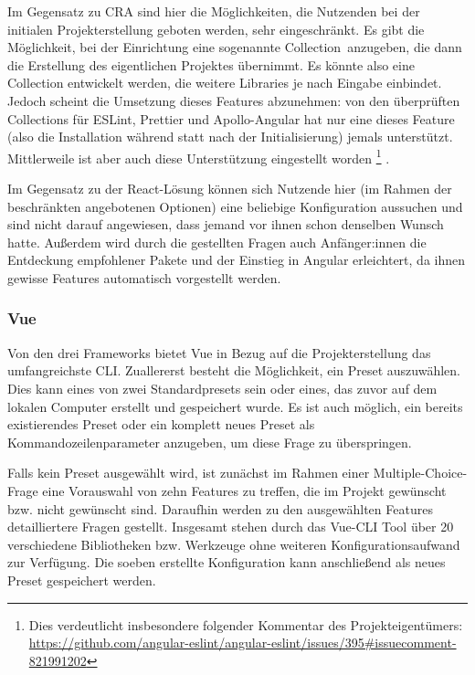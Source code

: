 Im Gegensatz zu \gls{CRA} sind hier die Möglichkeiten, die Nutzenden bei der initialen Projekterstellung geboten werden, sehr eingeschränkt. Es gibt die Möglichkeit, bei der Einrichtung eine sogenannte \glqq Collection\grqq\ anzugeben, die dann die Erstellung des eigentlichen Projektes übernimmt. Es könnte also eine Collection entwickelt werden, die weitere Libraries je nach Eingabe einbindet. Jedoch scheint die Umsetzung dieses Features abzunehmen: von den überprüften Collections für ESLint, Prettier und Apollo-Angular hat nur eine dieses Feature (also die Installation während statt nach der Initialisierung) jemals unterstützt. Mittlerweile ist aber auch diese Unterstützung eingestellt worden \cite{angular_eslint}\footnote{Dies verdeutlicht insbesondere folgender Kommentar des Projekteigentümers: \url{https://github.com/angular-eslint/angular-eslint/issues/395\#issuecomment-821991202}} \cite{prettier_angular_collection_file} \cite{apollo_angular_collection_file}.

Im Gegensatz zu der React-Lösung können sich Nutzende hier (im Rahmen der beschränkten angebotenen Optionen) eine beliebige Konfiguration aussuchen und sind nicht darauf angewiesen, dass jemand vor ihnen schon denselben Wunsch hatte. Außerdem wird durch die gestellten Fragen auch Anfänger:innen die Entdeckung empfohlener Pakete und der Einstieg in Angular erleichtert, da ihnen gewisse Features automatisch vorgestellt werden.


\subsubsection{Vue}
Von den drei Frameworks bietet Vue in Bezug auf die Projekterstellung das umfangreichste \gls{CLI}. Zuallererst besteht die Möglichkeit, ein Preset auszuwählen. Dies kann eines von zwei Standardpresets sein oder eines, das zuvor auf dem lokalen Computer erstellt und gespeichert wurde. Es ist auch möglich, ein bereits existierendes Preset oder ein komplett neues Preset als Kommandozeilenparameter anzugeben, um diese Frage zu überspringen.

Falls kein Preset ausgewählt wird, ist zunächst im Rahmen einer Multiple-Choice-Frage eine Vorauswahl von zehn Features zu treffen, die im Projekt gewünscht bzw. nicht gewünscht sind. Daraufhin werden zu den ausgewählten Features detailliertere Fragen gestellt. Insgesamt stehen durch das Vue-\gls{CLI} Tool über 20 verschiedene Bibliotheken bzw. Werkzeuge ohne weiteren Konfigurationsaufwand zur Verfügung. Die soeben erstellte Konfiguration kann anschließend als neues Preset gespeichert werden.


